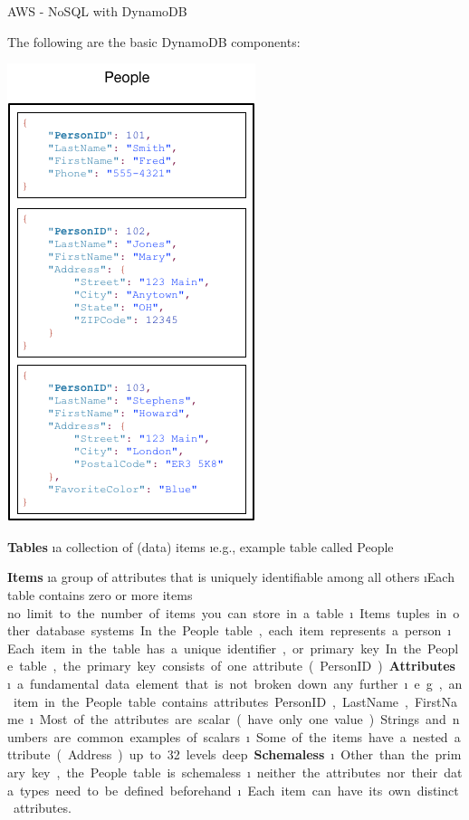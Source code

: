 \begin{frame}{AWS - NoSQL with DynamoDB}

The following are the basic DynamoDB components:

\includegraphics[height=\textheight]{imgs/HowItWorksPeople.png}

\textbf{Tables}
\i a collection of (data) items
\i e.g., example table called People

\textbf{Items}
\i a group of attributes that is uniquely identifiable among all others
\i Each table contains zero or more items
\si no limit to the number of items you can store in a table.
\i Items tuples in other database systems
\si In the People table, each item represents a person. 
\i Each item in the table has a unique identifier, or primary key
\si In the People table, the primary key consists of one attribute (PersonID)

\textbf{Attributes} 
\i a fundamental data element that is not broken down any further
\i e.g., an item in the People table contains attributes PersonID, LastName, FirstName
\i Most of the attributes are scalar (have only one value)
\si Strings and numbers are common examples of scalars
\i Some of the items have a nested attribute (Address)
\si up to 32 levels deep

\textbf{Schemaless}
\i Other than the primary key, the People table is schemaless
\i neither the attributes nor their data types need to be defined beforehand
\i Each item can have its own distinct attributes.


\end{frame}
